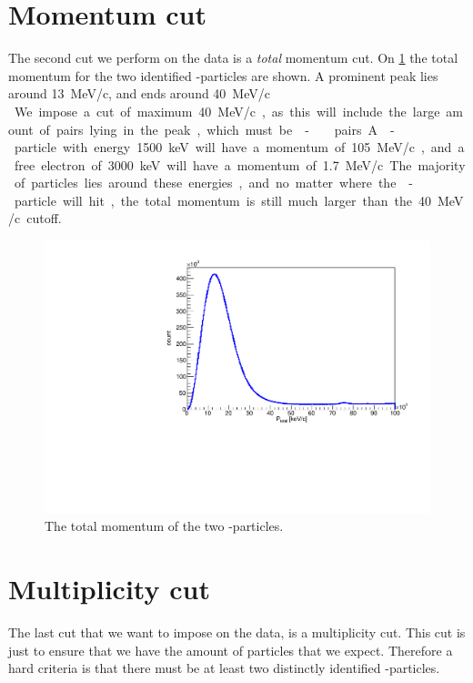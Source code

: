 \section{Momentum cut}
The second cut we perform on the data is a \textit{total} momentum cut. On \cref{fig:totalMomentum} the total momentum for the two identified \al-particles are shown. 
A prominent peak lies around \SI{13}{MeV/c}, and ends around \SI{40}{MeV/c }. 
We impose a cut of maximum \SI{40}{MeV/c}, as this will include the large amount of pairs lying in the peak, which must be \al-\al\ pairs. A \al-particle with energy \SI{1500}{keV} will have a momentum of \SI{105}{MeV/c}, and a free electron of \SI{3000}{keV} will have a momentum of \SI{1.7}{MeV/c}. 
The majority of particles lies around these energies, and no matter where the \be-particle will hit, the total momentum is still much larger than the \SI{40}{MeV/c} cutoff. 
\begin{figure}[h]
	\centering
	\includegraphics[width=\linewidth]{../figures/ptotNoCut.pdf}
	\caption{The total momentum of the two \al-particles.}
	\label{fig:totalMomentum}
\end{figure}

\section{Multiplicity cut}
The last cut that we want to impose on the data, is a multiplicity cut. This cut is just to ensure that we have the amount of particles that we expect. 
Therefore a hard criteria is that there must be at least two distinctly identified \al-particles. \\


